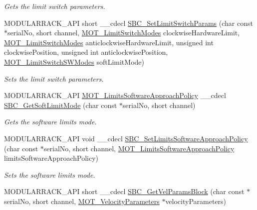 \begin{DoxyCompactItemize}
\begin{DoxyCompactList}\small\item\em Gets the limit switch parameters. \end{DoxyCompactList}\item 
M\+O\+D\+U\+L\+A\+R\+R\+A\+C\+K\+\_\+\+A\+PI short \+\_\+\+\_\+cdecl \hyperlink{group___modular_stepper_ga7c1ef6af1523d5e9b2a72210bc1614d8}{S\+B\+C\+\_\+\+Set\+Limit\+Switch\+Params} (char const $\ast$serial\+No, short channel, \hyperlink{group___common_ga682c3ff98dc472fbdc3cbc3267d38796}{M\+O\+T\+\_\+\+Limit\+Switch\+Modes} clockwise\+Hardware\+Limit, \hyperlink{group___common_ga682c3ff98dc472fbdc3cbc3267d38796}{M\+O\+T\+\_\+\+Limit\+Switch\+Modes} anticlockwise\+Hardware\+Limit, unsigned int clockwise\+Position, unsigned int anticlockwise\+Position, \hyperlink{group___common_ga7d4db5fc799ed3fd24818bff565afd85}{M\+O\+T\+\_\+\+Limit\+Switch\+S\+W\+Modes} soft\+Limit\+Mode)
\begin{DoxyCompactList}\small\item\em Sets the limit switch parameters. \end{DoxyCompactList}\item 
M\+O\+D\+U\+L\+A\+R\+R\+A\+C\+K\+\_\+\+A\+PI \hyperlink{group___common_gad9af9612d4e18c6cd2e7aaaedd6dc49d}{M\+O\+T\+\_\+\+Limits\+Software\+Approach\+Policy} \+\_\+\+\_\+cdecl \hyperlink{group___modular_stepper_ga652a67b68a5c5b52eca24d572414e2ff}{S\+B\+C\+\_\+\+Get\+Soft\+Limit\+Mode} (char const $\ast$serial\+No, short channel)
\begin{DoxyCompactList}\small\item\em Gets the software limits mode. \end{DoxyCompactList}\item 
M\+O\+D\+U\+L\+A\+R\+R\+A\+C\+K\+\_\+\+A\+PI void \+\_\+\+\_\+cdecl \hyperlink{group___modular_stepper_gac6bb10357f10b3ed25271ec9ae2864c7}{S\+B\+C\+\_\+\+Set\+Limits\+Software\+Approach\+Policy} (char const $\ast$serial\+No, short channel, \hyperlink{group___common_gad9af9612d4e18c6cd2e7aaaedd6dc49d}{M\+O\+T\+\_\+\+Limits\+Software\+Approach\+Policy} limits\+Software\+Approach\+Policy)
\begin{DoxyCompactList}\small\item\em Sets the software limits mode. \end{DoxyCompactList}\item 
M\+O\+D\+U\+L\+A\+R\+R\+A\+C\+K\+\_\+\+A\+PI short \+\_\+\+\_\+cdecl \hyperlink{group___modular_stepper_gae09cf1969827f2f704723b584b0e776d}{S\+B\+C\+\_\+\+Get\+Vel\+Params\+Block} (char const $\ast$serial\+No, short channel, \hyperlink{struct_m_o_t___velocity_parameters}{M\+O\+T\+\_\+\+Velocity\+Parameters} $\ast$velocity\+Parameters)

\end{DoxyCompactItemize}
